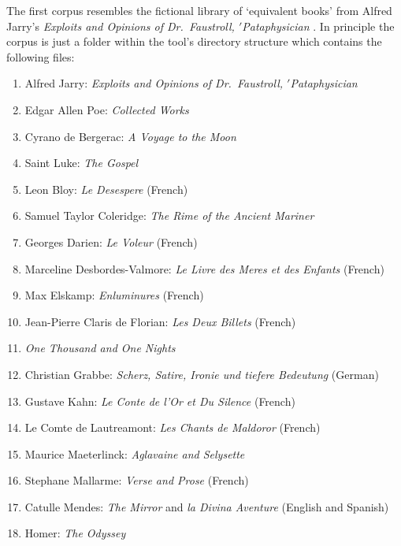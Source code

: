The first corpus resembles the fictional library of `equivalent books' from Alfred Jarry's \textit{Exploits and Opinions of Dr.\ Faustroll, $'$Pataphysician} \autocite*{Jarry1996}. In principle the corpus is just a folder within the tool's directory structure which contains the following files:


\begin{enumerate}[start=0]
\item Alfred Jarry: \textit{Exploits and Opinions of Dr.\ Faustroll, $'$Pataphysician}
\item Edgar Allen Poe: \textit{Collected Works}
\item Cyrano de Bergerac: \textit{A Voyage to the Moon}
\item Saint Luke: \textit{The Gospel}
\item Leon Bloy: \textit{Le Desespere} (French)
\item Samuel Taylor Coleridge: \textit{The Rime of the Ancient Mariner}
\item Georges Darien: \textit{Le Voleur} (French)
\item Marceline Desbordes-Valmore: \textit{Le Livre des Meres et des Enfants} (French)
\item Max Elskamp: \textit{Enluminures} (French)
\item Jean-Pierre Claris de Florian: \textit{Les Deux Billets} (French)
\item \textit{One Thousand and One Nights}
\item Christian Grabbe: \textit{Scherz, Satire, Ironie und tiefere Bedeutung} (German)
\item Gustave Kahn: \textit{Le Conte de l'Or et Du Silence} (French)
\item Le Comte de Lautreamont: \textit{Les Chants de Maldoror} (French)
\item Maurice Maeterlinck: \textit{Aglavaine and Selysette}
\item Stephane Mallarme: \textit{Verse and Prose} (French)
\item Catulle Mendes: \textit{The Mirror} and \textit{la Divina Aventure} (English and Spanish)
\item Homer: \textit{The Odyssey}

\end{enumerate}
